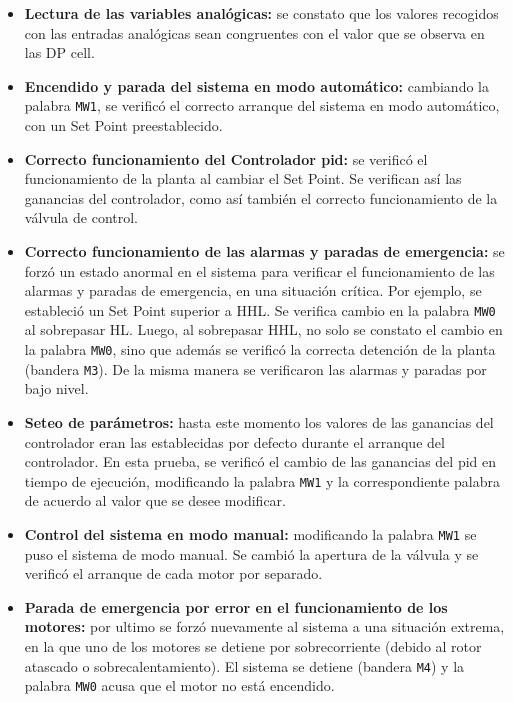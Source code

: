 \begin{itemize}
 \item \textbf{Lectura de las variables analógicas:}
 se constato que los valores recogidos con las entradas analógicas sean
congruentes con el valor que se observa en las DP cell.

  \item \textbf{Encendido y parada del sistema en modo automático:} cambiando
la palabra \verb|MW1|, se verificó el correcto arranque del sistema en modo
automático, con un Set Point preestablecido.

 \item \textbf{Correcto funcionamiento del Controlador \gls{pid}:}
 se verificó el funcionamiento de la planta al cambiar el Set Point.
Se verifican así las ganancias del controlador, como así también el correcto
funcionamiento de la válvula de control.

 \item \textbf{Correcto funcionamiento de las alarmas y paradas de emergencia:}
 se forzó un estado anormal en el sistema para verificar el funcionamiento de
las alarmas y paradas de emergencia, en una situación crítica. Por ejemplo, se
estableció un Set Point superior a HHL.
 Se verifica cambio en la palabra \verb|MW0| al sobrepasar HL.
 Luego, al sobrepasar HHL, no solo se constato el cambio en la
 palabra \verb|MW0|, sino que además se verificó la correcta detención de la
planta (bandera \verb|M3|).
 De la misma manera se verificaron las alarmas y paradas por bajo nivel.
 
 \item \textbf{Seteo de parámetros:}
 hasta este momento los valores de las ganancias del controlador eran las
establecidas por defecto durante el arranque del controlador.
 En esta prueba, se verificó el cambio de las ganancias del \gls{pid} en tiempo
de ejecución, modificando la palabra \verb|MW1| y la
correspondiente palabra de acuerdo al valor que se desee modificar.
 
 \item \textbf{Control del sistema en modo manual:}
 modificando la palabra \verb|MW1| se puso el sistema de modo manual.
 Se cambió la apertura de la válvula y se verificó el arranque de cada motor
por separado.
 
 \item \textbf{Parada de emergencia por error en el funcionamiento de los
motores:} por ultimo se forzó nuevamente al sistema a una situación extrema, en
la que uno de los motores se detiene por sobrecorriente (debido al rotor
atascado o sobrecalentamiento).
 El sistema se detiene (bandera \verb|M4|) y la palabra \verb|MW0| acusa que el
motor no está encendido.
\end{itemize}
